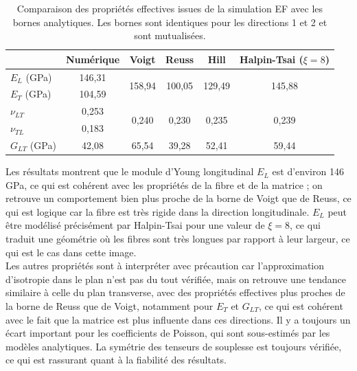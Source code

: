 \documentclass[a4paper,11pt]{article}
\begin{document}
\begin{table}[H]
    \centering
    \begin{tabular}{|l|c|c|c|c|c|}
        \hline
        & \textbf{Numérique} & \textbf{Voigt} & \textbf{Reuss} & \textbf{Hill} & \textbf{Halpin-Tsai ($\xi=8$)} \\
        \hline
        $E_L$ (GPa) & 146,31 & \multirow{2}{*}{158,94} & \multirow{2}{*}{100,05} & \multirow{2}{*}{129,49} & \multirow{2}{*}{145,88} \\
        $E_T$ (GPa) & 104,59 &  &  &  &  \\
        \hline
        $\nu_{LT}$ & 0,253 & \multirow{2}{*}{0,240} & \multirow{2}{*}{0,230} & \multirow{2}{*}{0,235} & \multirow{2}{*}{0,239} \\
        $\nu_{TL}$ & 0,183 &  &  &  &  \\
        \hline
        $G_{LT}$ (GPa) & 42,08 & 65,54 & 39,28 & 52,41 & 59,44 \\
        \hline
    \end{tabular}
    \caption{Comparaison des propriétés effectives issues de la simulation EF avec les bornes analytiques. Les bornes sont identiques pour les directions 1 et 2 et sont mutualisées.}
    \label{tab:results_longi}
\end{table}

Les résultats montrent que le module d'Young longitudinal $E_L$ est d'environ 146 GPa, ce qui est cohérent avec les propriétés de la fibre et de la matrice ; on retrouve un comportement bien plus proche de la borne de Voigt que de Reuss, ce qui est logique car la fibre est très rigide dans la direction longitudinale. $E_L$ peut être modélisé précisément par Halpin-Tsai pour une valeur de $\xi = 8$, ce qui traduit une géométrie où les fibres sont très longues par rapport à leur largeur, ce qui est le cas dans cette image. \\

Les autres propriétés sont à interpréter avec précaution car l'approximation d'isotropie dans le plan n'est pas du tout vérifiée, mais on retrouve une tendance similaire à celle du plan transverse, avec des propriétés effectives plus proches de la borne de Reuss que de Voigt, notamment pour $E_T$ et $G_{LT}$, ce qui est cohérent avec le fait que la matrice est plus influente dans ces directions. Il y a toujours un écart important pour les coefficients de Poisson, qui sont sous-estimés par les modèles analytiques. La symétrie des tenseurs de souplesse est toujours vérifiée, ce qui est rassurant quant à la fiabilité des résultats. \\
\end{document}
